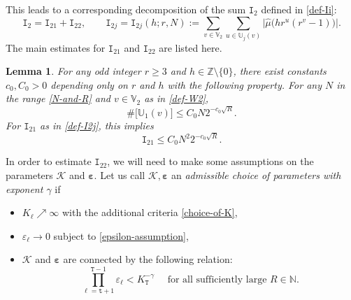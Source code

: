 \documentclass[12pt, twoside]{article}
\newtheorem{lemma}[theorem]{Lemma}
\theoremstyle{definition}
\numberwithin{equation}{section}
\begin{document}
This leads to a corresponding decomposition of the sum $\mathtt I_2$ defined in \eqref{def-Ii}: 
\begin{equation} 
\mathtt I_2 = \mathtt I_{21} + \mathtt I_{22}, \qquad \mathtt I_{2j} = \mathtt I_{2j}(h;r,N) := \sum_{v \in \mathbb V_2} \sum_{u \in \mathbb U_j(v)} \bigl| \widehat{\mu}\bigl(hr^u(r^v-1) \bigr)\bigr|. \label{def-I2j}
\end{equation} 
The main estimates for $\mathtt I_{21}$ and $\mathtt I_{22}$ are listed here.  
\begin{lemma} \label{I21-lemma}
For any odd integer $r \geq 3$ and $h \in \mathbb Z \setminus \{0\}$, there exist constants $c_0, C_0 > 0$ depending only on $r$ and $h$ with the following property. For any $N$ in the range \eqref{N-and-R} and $v \in \mathbb V_2$ as in \eqref{def-W2},  
\begin{equation} \label{U1-cardinality} 
\# \bigl[ \mathbb U_1(v) \bigr] \leq  C_0 N2^{-c_0 \sqrt{R}}. 
\end{equation}
For $\mathtt I_{21}$ as in \eqref{def-I2j}, this implies
\begin{equation} \label{I21-bound} 
\mathtt I_{21} \leq C_0 N^2 2^{-c_0 \sqrt{R}}. 
\end{equation} 
\end{lemma} 
\noindent In order to estimate $\mathtt I_{22}$, we will need to make some assumptions on the parameters $\mathcal K$ and $\pmb{\varepsilon}$. Let us call $\mathcal K, \pmb{\varepsilon}$ an {\em{admissible choice of parameters with exponent $\gamma$}} if 
\begin{itemize} 
\item $K_{\ell} \nearrow \infty$ with the additional criteria \eqref{choice-of-K}, 
\item $\varepsilon_{\ell} \rightarrow 0$ subject to \eqref{epsilon-assumption}, 
\item $\mathcal K$ and $\pmb{\varepsilon}$ are connected by the following relation: 
\begin{equation} 
\prod_{\ell=\mathtt t+1}^{\mathtt T-1} \varepsilon_{\ell} < K_{\mathtt T}^{-\gamma} \quad \text{ for all sufficiently large } R \in \mathbb N. \label{tT-condition} 
\end{equation} 
\end{itemize} 
\end{document}

